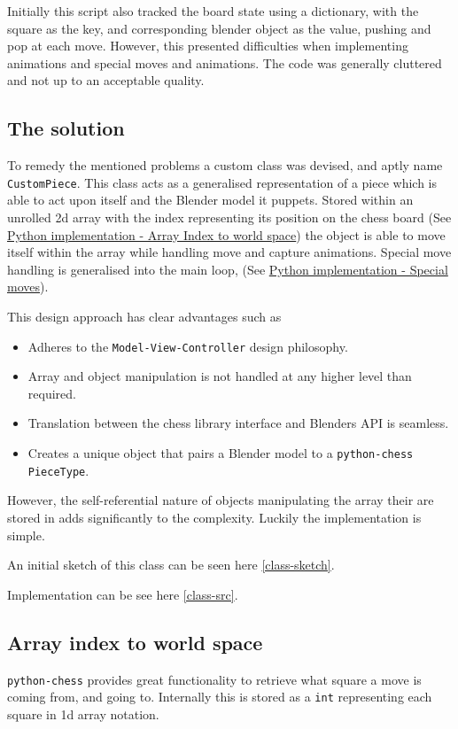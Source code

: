 \documentclass[11pt]{article}
\begin{document}
Initially this script also tracked the board state using a dictionary, with the
square as the key, and corresponding blender object as the value, pushing and
pop at each move. However, this presented difficulties when implementing
animations and special moves and animations. The code was generally cluttered
and not up to an acceptable quality.
\subsection{The solution}
\label{sec:orgd80d6ac}
To remedy the mentioned problems a custom class was devised, and aptly name
\texttt{CustomPiece}. This class acts as a generalised representation of a piece which
is able to act upon itself and the Blender model it puppets. Stored within an
unrolled 2d array with the index representing its position on the chess board
(See \hyperref[sec:org67aeaaf]{Python implementation - Array Index to world space}) the object is able to
move itself within the array while handling move and capture animations. Special
move handling is generalised into the main loop, (See \hyperref[sec:orgdb959ac]{Python implementation -
Special moves}).

This design approach has clear advantages such as
\begin{itemize}
\item Adheres to the \texttt{Model-View-Controller} design philosophy.
\item Array and object manipulation is not handled at any higher level than required.
\item Translation between the chess library interface and Blenders API is seamless.
\item Creates a unique object that pairs a Blender model to a \texttt{python-chess}
\texttt{PieceType}.
\end{itemize}
However, the self-referential nature of objects manipulating the array their
are stored in adds significantly to the complexity. Luckily the implementation is
simple.

An initial sketch of this class can be seen here \ref{class-sketch}.

Implementation can be see here \ref{class-src}.
\subsection{Array index to world space}
\label{sec:org67aeaaf}
\texttt{python-chess} provides great functionality to retrieve what square a move is
coming from, and going to. Internally this is stored as a \texttt{int} representing
each square in 1d array notation.
\end{document}
